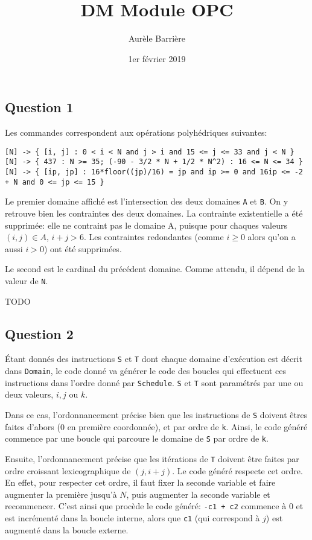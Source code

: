 \documentclass{article}
\title{DM Module OPC}
\author{Aur\`ele Barri\`ere}
\date{1er février 2019}
\begin{document}
\maketitle

\subsection*{Question 1}
Les commandes correspondent aux opérations polyhédriques suivantes:
\begin{lstlisting}
[N] -> { [i, j] : 0 < i < N and j > i and 15 <= j <= 33 and j < N }
[N] -> { 437 : N >= 35; (-90 - 3/2 * N + 1/2 * N^2) : 16 <= N <= 34 }
[N] -> { [ip, jp] : 16*floor((jp)/16) = jp and ip >= 0 and 16ip <= -2 + N and 0 <= jp <= 15 }
\end{lstlisting}

Le premier domaine affiché est l'intersection des deux domaines \lstinline{A} et \lstinline{B}.
On y retrouve bien les contraintes des deux domaines. La contrainte existentielle a été supprimée: elle ne contraint pas le domaine A, puisque pour chaques valeurs $(i,j)\in A$, $i+j>6$. Les contraintes redondantes (comme $i\geq 0$ alors qu'on a aussi $i>0$) ont été supprimées.

Le second est le cardinal du précédent domaine. Comme attendu, il dépend de la valeur de \lstinline{N}.

TODO

\subsection*{Question 2}

Étant donnés des instructions \lstinline{S} et \lstinline{T} dont chaque domaine d'exécution est décrit dans \lstinline{Domain}, le code donné va générer le code des boucles qui effectuent ces instructions dans l'ordre donné par \lstinline{Schedule}. \lstinline{S} et \lstinline{T} sont paramétrés par une ou deux valeurs, $i,j$ ou $k$.

Dans ce cas, l'ordonnancement précise bien que les instructions de \lstinline{S} doivent êtres faites d'abors (0 en première coordonnée), et par ordre de \lstinline{k}.
Ainsi, le code généré commence par une boucle qui parcoure le domaine de \lstinline{S} par ordre de \lstinline{k}.

Ensuite, l'ordonnancement précise que les itérations de \lstinline{T} doivent être faites par ordre croissant lexicographique de $(j,i+j)$.
Le code généré respecte cet ordre.
En effet, pour respecter cet ordre, il faut fixer la seconde variable et faire augmenter la première jusqu'à $N$, puis augmenter la seconde variable et recommencer.
C'est ainsi que procède le code généré: \lstinline{-c1 + c2} commence à 0 et est incrémenté dans la boucle interne, alors que \lstinline{c1} (qui correspond à $j$) est augmenté dans la boucle externe.
\end{document}
